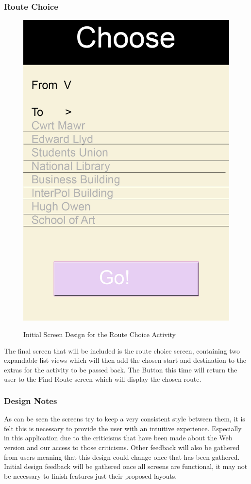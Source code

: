 \subsubsection{Route Choice}
\begin{figure}[h]
\includegraphics[scale=0.6]{Design/Choose.png}\\
\caption[Initial Route Choice Design]{Initial Screen Design for the Route Choice Activity}
\end{figure}
The final screen that will be included is the route choice screen, containing two expandable list views which will then add the chosen start and destination to the extras for the activity to be passed back. The Button this time will return the user to the Find Route screen which will display the chosen route. 
\subsubsection{Design Notes}
As can be seen the screens try to keep a very consistent style between them, it is felt this is necessary to provide the user with an intuitive experience. Especially in this application due to the criticisms that have been made about the Web version and our access to those criticisms. Other feedback will also be gathered from users meaning that this design could change once that has been gathered. Initial design feedback will be gathered once all screens are functional, it may not be necessary to finish features just their proposed layouts.

